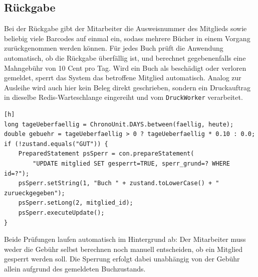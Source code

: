 \subsection{Rückgabe}
Bei der Rückgabe gibt der Mitarbeiter die Ausweisnummer des Mitglieds sowie beliebig viele Barcodes auf einmal ein, sodass mehrere Bücher in einem Vorgang zurückgenommen werden können. Für jedes Buch prüft die Anwendung automatisch, ob die Rückgabe überfällig ist, und berechnet gegebenenfalls eine Mahngebühr von 10 Cent pro Tag. Wird ein Buch als beschädigt oder verloren gemeldet, sperrt das System das betroffene Mitglied automatisch. Analog zur Ausleihe wird auch hier kein Beleg direkt geschrieben, sondern ein Druckauftrag in dieselbe Redis-Warteschlange eingereiht und vom \texttt{DruckWorker} verarbeitet.
\begin{verbatim}[h]
long tageUeberfaellig = ChronoUnit.DAYS.between(faellig, heute);
double gebuehr = tageUeberfaellig > 0 ? tageUeberfaellig * 0.10 : 0.0;
if (!zustand.equals("GUT")) {
    PreparedStatement psSperr = con.prepareStatement(
        "UPDATE mitglied SET gesperrt=TRUE, sperr_grund=? WHERE id=?");
    psSperr.setString(1, "Buch " + zustand.toLowerCase() + " zurueckgegeben");
    psSperr.setLong(2, mitglied_id);
    psSperr.executeUpdate();
}
\end{verbatim}
Beide Prüfungen laufen automatisch im Hintergrund ab: Der Mitarbeiter muss weder die Gebühr selbst berechnen noch manuell entscheiden, ob ein Mitglied gesperrt werden soll. Die Sperrung erfolgt dabei unabhängig von der Gebühr allein aufgrund des gemeldeten Buchzustands.
